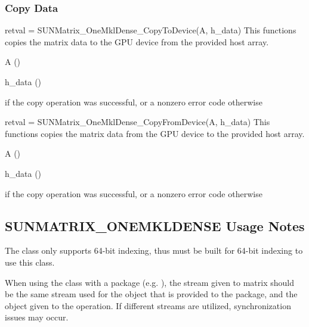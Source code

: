\subsubsection*{Copy Data}


{
  retval = SUNMatrix\_OneMklDense\_CopyToDevice(A, h\_data)
}
{
  This functions copies the matrix data to the GPU device from the provided
  host array.
}
{
  \begin{args}
  \item[A] ()
  \item[h\_data] ()
  \end{args}
}
{
   if the copy operation was successful, or a nonzero error
  code otherwise
}
{}


{
  retval = SUNMatrix\_OneMklDense\_CopyFromDevice(A, h\_data)
}
{
  This functions copies the matrix data from the GPU device to the provided
  host array.
}
{
  \begin{args}
  \item[A] ()
  \item[h\_data] ()
  \end{args}
}
{
   if the copy operation was successful, or a nonzero error
  code otherwise
}
{}

\subsection{SUNMATRIX\_ONEMKLDENSE Usage Notes}
\label{ss:sunmat_OneMkldense_notes}

The  class only supports 64-bit indexing,
thus {\sundials} must be built for 64-bit indexing to use this class.

{\warn} When using the  class with a {\sundials}
package (e.g. {\cvode}), the stream given to matrix should be the same
stream used for the {\nvector} object that is provided to the package,
and the {\nvector} object given to the  operation. If different
streams are utilized, synchronization issues may occur.
